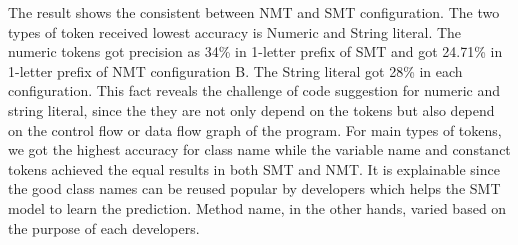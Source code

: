 The result shows the consistent between NMT and SMT configuration. The two types of token received lowest accuracy is Numeric and String literal. The numeric tokens got precision as 34\% in 1-letter prefix of SMT and got 24.71\% in 1-letter prefix of NMT configuration B. The String literal got 28\% in each configuration. This fact reveals the challenge of code suggestion for numeric and string literal, since the they are not only depend on the tokens but also depend on the control flow or data flow graph of the program. For main types of tokens, we got the highest accuracy for class name while the variable name and constanct tokens achieved the equal results in both SMT and NMT. It is explainable since the good class names can be reused popular by developers which helps the SMT model to learn the prediction. Method name, in the other hands, varied based on the purpose of each developers.

